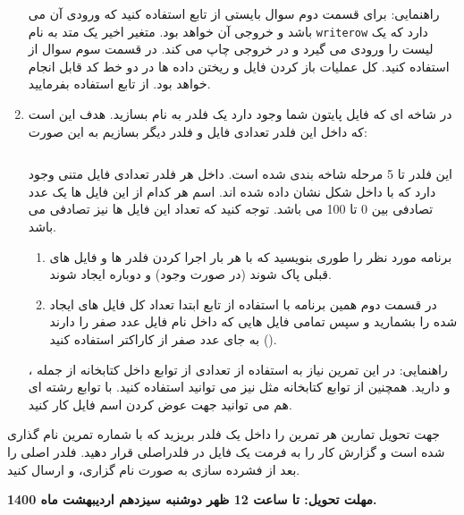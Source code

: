\documentclass[oneside]{article}
\newcommand{\inputcode}[2]{\inputminted[mathescape,%
                                                 linenos=true,%
                                                 formatcom=\small\setstretch{1}]{#1}{#2}}%
\begin{document}
\begin{enumerate}
راهنمایی: برای قسمت دوم سوال بایستی از تابع 
استفاده کنید که ورودی آن 
می باشد و خروجی آن 
خواهد بود. متغیر اخیر یک متد به نام 
\texttt{writerow}
دارد که یک لیست را ورودی می گیرد و در خروجی چاپ می کند. در قسمت سوم سوال از
استفاده کنید. کل عملیات باز کردن فایل و ریختن داده ها در دو خط کد قابل انجام خواهد بود. از تابع 
استفاده بفرمایید.
\item
در شاخه ای که فایل پایتون شما وجود دارد یک فلدر به نام
بسازید. هدف این است که داخل این فلدر تعدادی فایل و فلدر دیگر بسازیم به این صورت:
\begin{latin}\inputcode{Text}{random_folder_structure.txt}\end{latin}
این فلدر تا 5 مرحله شاخه بندی شده است. داخل هر فلدر تعدادی فایل متنی وجود دارد که با 
داخل شکل نشان داده شده اند. اسم هر کدام از این فایل ها یک عدد تصادفی بین 0 تا 100 می باشد. توجه کنید که تعداد این فایل ها نیز تصادفی می باشد. 
\begin{enumerate}
\item
برنامه مورد نظر را طوری بنویسید که با هر بار اجرا کردن فلدر ها و فایل های قبلی پاک شوند (در صورت وجود) و دوباره ایجاد شوند.
\item
در قسمت دوم همین برنامه با استفاده از تابع
ابتدا تعداد کل فایل های ایجاد شده را بشمارید و سپس  تمامی  فایل هایی که داخل  نام  فایل عدد صفر را دارند به جای عدد صفر از کاراکتر
استفاده کنید 
().
\end{enumerate}
راهنمایی: در این تمرین نیاز به استفاده از تعدادی از توابع داخل کتابخانه 
از جمله
،
و 
دارید. همچنین از توابع کتابخانه
مثل
نیز می توانید استفاده کنید. با توابع رشته ای هم می توانید جهت عوض کردن اسم فایل کار کنید.

\end{enumerate}

\begin{tcolorbox}
جهت تحویل تمارین هر تمرین را داخل یک فلدر بریزید که با شماره تمرین نام گذاری شده است و 
 گزارش کار را به فرمت یک فایل
در فلدراصلی قرار دهید. فلدر اصلی را بعد از فشرده سازی به صورت 
 نام گزاری، و ارسال کنید.
\begin{center}
\textbf{
مهلت تحویل: تا ساعت 12 ظهر دوشنبه سیزدهم اردیبهشت ماه 1400.
}
\end{center}
\end{tcolorbox}
\end{document}
